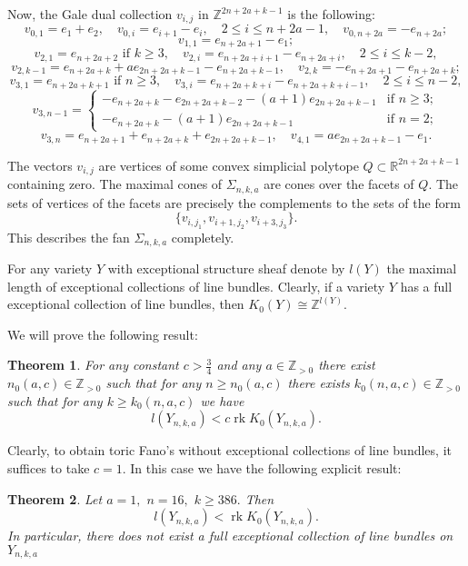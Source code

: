 \documentclass[11pt,leqno]{amsart}
\newtheorem{theo}{Theorem}[section]
\numberwithin{equation}{section}
\def\R{\mathbb{R}}
\def\Z{\mathbb{Z}}
\newcommand{\rk}{\operatorname{rk}}
\begin{document}
Now, the Gale dual collection $v_{i,j}$ in $\Z^{2n+2a+k-1}$ is the following:
$$v_{0,1}=e_1+e_2,\quad v_{0,i}=e_{i+1}-e_i,\quad 2\leq i\leq n+2a-1,\quad v_{0,n+2a}=-e_{n+2a};$$
$$v_{1,1}=e_{n+2a+1}-e_1;$$
$$v_{2,1}=e_{n+2a+2}\text{ if }k\geq 3,\quad v_{2,i}=e_{n+2a+i+1}-e_{n+2a+i},\quad 2\leq i\leq k-2,$$
$$v_{2,k-1}=e_{n+2a+k}+ae_{2n+2a+k-1}-e_{n+2a+k-1},\quad v_{2,k}=-e_{n+2a+1}-e_{n+2a+k};$$
$$v_{3,1}=e_{n+2a+k+1}\text{ if }n\geq 3,\quad v_{3,i}=e_{n+2a+k+i}-e_{n+2a+k+i-1},\quad 2\leq i\leq n-2,$$
$$v_{3,n-1}=\begin{cases}-e_{n+2a+k}-e_{2n+2a+k-2}-(a+1)e_{2n+2a+k-1} & \text{if }n\geq 3;\\
-e_{n+2a+k}-(a+1)e_{2n+2a+k-1} & \text{if }n=2;\end{cases}$$
$$v_{3,n}=e_{n+2a+1}+e_{n+2a+k}+e_{2n+2a+k-1},\quad v_{4,1}=ae_{2n+2a+k-1}-e_1.$$

The vectors $v_{i,j}$ are vertices of some convex simplicial polytope $Q\subset \R^{2n+2a+k-1}$ containing zero. The maximal cones
of $\Sigma_{n,k,a}$ are cones over the facets of $Q.$ The sets of vertices of the facets are precisely the complements
to the sets of the form
$$\{v_{i,j_1}, v_{i+1,j_2}, v_{i+3,j_3}\}.$$
This describes the fan $\Sigma_{n,k,a}$ completely.

For any variety $Y$ with exceptional structure sheaf denote by $l\left(Y\right)$ the maximal length of exceptional collections of line bundles.
Clearly, if a variety $Y$ has a full exceptional collection of line bundles, then $K_0(Y)\cong \Z^{l\left(Y\right)}.$

We will prove the following result:

\begin{theo}\label{<c} For any constant $c>\frac34$ and any
$a\in\Z_{>0}$ there exist $n_0(a,c)\in\Z_{>0}$ such that for any $n\geq n_0(a,c)$ there exists $k_0(n,a,c)\in\Z_{>0}$
such that for any $k\geq k_0(n,a,c)$ we have $$l\left(Y_{n,k,a}\right)<c\rk K_0(Y_{n,k,a}).$$\end{theo}

Clearly, to obtain toric Fano's without exceptional collections of line bundles, it suffices to take $c=1.$ In this case we have the following explicit result:

\begin{theo}\label{counterex}Let $a=1,$ $n=16,$ $k\geq 386.$ Then $$l\left(Y_{n,k,a}\right)<\rk K_0(Y_{n,k,a}).$$
In particular, there does not exist a full exceptional collection of line bundles on $Y_{n,k,a}$\end{theo}
\end{document}
